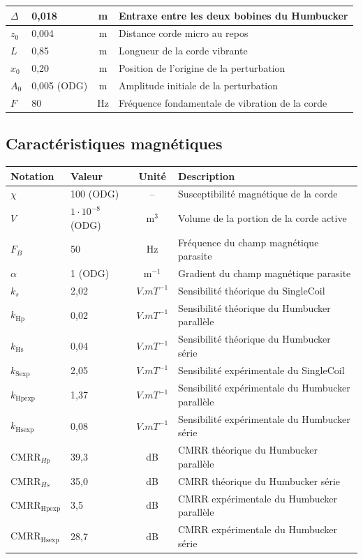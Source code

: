 \documentclass[11pt, a4paper]{article}
\begin{document}
\begin{center}
\begin{tabularx}{\textwidth}{llcX}
$\Delta$ & 0,018 & m & Entraxe entre les deux bobines du Humbucker \\
\midrule
$z_{0}$ & 0,004 & m & Distance corde micro au repos \\
$L$ & 0,85 & m & Longueur de la corde vibrante \\
$x_{0}$ & 0,20 & m & Position de l'origine de la perturbation \\
$A_{0}$ & 0,005 (ODG) & m & Amplitude initiale de la perturbation \\
$F$ & 80 & Hz & Fréquence fondamentale de vibration de la corde \\
\bottomrule
\end{tabularx}
\end{center}

\subsection{Caractéristiques magnétiques}
\begin{center}
\small
\begin{tabularx}{\textwidth}{llcX}
\toprule
\textbf{Notation} & \textbf{Valeur} & \textbf{Unité} & \textbf{Description} \\
\midrule
$\chi$ & 100 (ODG) & -- & Susceptibilité magnétique de la corde \\
$V$ & $1 \cdot 10^{-8}$ (ODG) & m$^{3}$ & Volume de la portion de la corde active \\
\midrule
$F_{B}$ & 50 & Hz & Fréquence du champ magnétique parasite \\
$\alpha$ & 1 (ODG) & m$^{-1}$ & Gradient du champ magnétique parasite \\
\midrule
$k_{s}$ & 2,02 & $V.mT^{-1}$ & Sensibilité théorique du SingleCoil \\
$k_{\text{Hp}}$ & 0,02 & $V.mT^{-1}$ & Sensibilité théorique du Humbucker parallèle \\
$k_{\text{Hs}}$ & 0,04 & $V.mT^{-1}$ & Sensibilité théorique du Humbucker série \\
$k_{\text{Sexp}}$ & 2,05 & $V.mT^{-1}$ & Sensibilité expérimentale du SingleCoil \\
$k_{\text{Hpexp}}$ & 1,37 & $V.mT^{-1}$ & Sensibilité expérimentale du Humbucker parallèle \\
$k_{\text{Hsexp}}$ & 0,08 & $V.mT^{-1}$ & Sensibilité expérimentale du Humbucker série \\
\midrule
$\text{CMRR}_{Hp}$ & 39,3 & dB & CMRR théorique du Humbucker parallèle \\
$\text{CMRR}_{Hs}$ & 35,0 & dB & CMRR théorique du Humbucker série \\
$\text{CMRR}_{\text{Hpexp}}$ & 3,5 & dB & CMRR expérimentale du Humbucker parallèle \\
$\text{CMRR}_{\text{Hsexp}}$ & 28,7 & dB & CMRR expérimentale du Humbucker série \\
\bottomrule
\end{tabularx}
\end{center}
\end{document}
